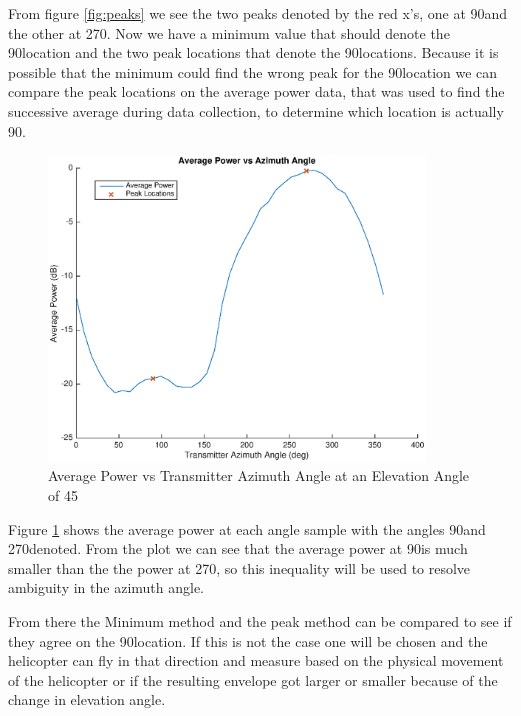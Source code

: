 From figure \ref{fig:peaks}  we see the two peaks denoted by the red x's, one at 90\textdegree \space and the other at  270\textdegree. Now we have a minimum value that should denote the 90\textdegree \space location and the two peak locations that denote the 90\textdegree {}\textdegree locations. Because it is possible that the minimum could find the wrong peak for the 90\textdegree \space location we can compare the peak locations on the average power data, that was used to find the successive average during data collection, to determine which location is actually 90\textdegree.

\begin{figure}
	\begin{center}
		\includegraphics[width=10cm]{images/results/average_power_vs_Azimuth.eps}
		\caption{Average Power vs Transmitter Azimuth Angle at an Elevation Angle of 45\textdegree}
		\label{fig:ave_power}
	\end{center}
\end{figure}

Figure \ref{fig:ave_power}  shows the average power at each angle sample with the angles 90\textdegree \space and 270\textdegree denoted. From the plot we can see that the average power at 90\textdegree \space is much smaller than the the power at 270\textdegree, so this inequality will be used to resolve ambiguity in the azimuth angle. 

From there the Minimum method and the peak method can be compared to see if they agree on the 90\textdegree \space location. If this is not the case one will be chosen and the helicopter can fly in that direction and measure based on the physical movement of the helicopter or if the resulting envelope got larger or smaller because of the change in elevation angle.

